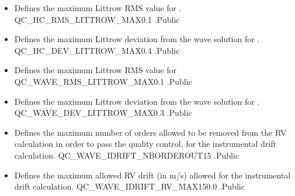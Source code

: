 \begin{itemize}
\item {} 
{Defines the maximum Littrow RMS value for \calHC.}
{QC\_HC\_RMS\_LITTROW\_MAX}{0.1}
{\calHC}{\constantsfile}{\calHC.\progMAIN}{Public}

\item {} 
{Defines the maximum Littrow deviation from the wave solution for \calHC.}
{QC\_HC\_DEV\_LITTROW\_MAX}{0.4}
{\calHC}{\constantsfile}{\calHC.\progMAIN}{Public}

\item {} 
{Defines the maximum Littrow RMS value for \calWAVE}
{QC\_WAVE\_RMS\_LITTROW\_MAX}{0.1}
{\calWAVE}{\constantsfile}{\calWAVE.\progMAIN}{Public}

\item {} 
{Defines the maximum Littrow deviation from the wave solution for \calWAVE.}
{QC\_WAVE\_DEV\_LITTROW\_MAX}{0.3}
{\calWAVE}{\constantsfile}{\calWAVE.\progMAIN}{Public}

\item {} 
{Defines the maximum number of orders allowed to be removed from the RV calculation in order to pass the quality control, for the instrumental drift calculation.}
{QC\_WAVE\_IDRIFT\_NBORDEROUT}{15}
{\calWAVE}{\constantsfile}{\spirouWAVE.}{Public}

\item {} 
{Defines the maximum allowed RV drift (in m/s) allowed for the instrumental drift calculation.}
{QC\_WAVE\_IDRIFT\_RV\_MAX}{150.0}
{\calWAVE}{\constantsfile}{\spirouWAVE.}{Public}


\end{itemize}







\clearpage
\newpage
